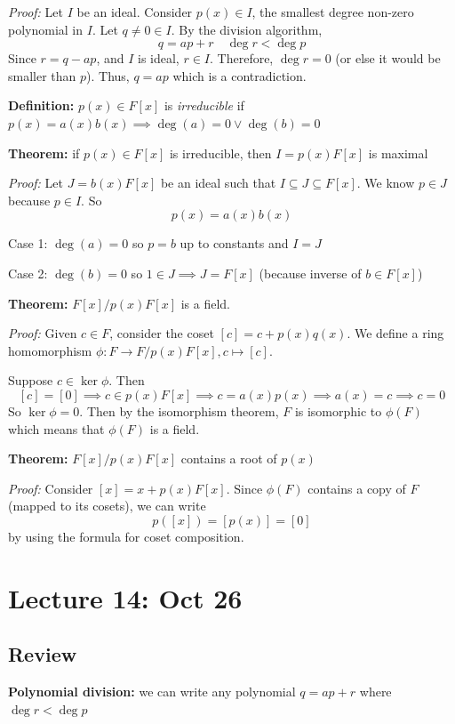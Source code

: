 \documentclass[12pt]{report}
\begin{document}
        \emph{Proof:} Let $I$ be an ideal. Consider $p(x) \in I$, the smallest degree non-zero polynomial in $I$. Let $q \neq 0 \in I$. By the division algorithm,
            \[q = ap + r \quad \deg r < \deg p\]
        Since $r = q - ap$, and $I$ is ideal, $r \in I$. Therefore, $\deg r = 0$ (or else it would be smaller than $p$). Thus, $q = ap$ which is a contradiction. 

    \textbf{Definition:} $p(x) \in F[x]$ is \emph{irreducible} if $p(x) = a(x)b(x) \implies \deg(a) = 0 \lor \deg(b) = 0$

    \textbf{Theorem:} if $p(x) \in F[x]$ is irreducible, then $I = p(x)F[x]$ is maximal

        \emph{Proof:} Let $J = b(x)F[x]$ be an ideal such that $I \subseteq J \subseteq F[x]$. We know $p \in J$ because $p \in I$. So 
        \[p(x) = a(x)b(x)\]

        Case 1: $\deg(a) = 0$ so $p = b$ up to constants and $I = J$

        Case 2: $\deg(b) = 0$ so $1 \in J \implies J = F[x]$ (because inverse of $b \in F[x]$)

    \textbf{Theorem:} $F[x]/p(x)F[x]$ is a field. 

        \emph{Proof:} Given $c \in F$, consider the coset $[c] = c + p(x)q(x)$. We define a ring homomorphism $\phi: F \to F/p(x)F[x], c \mapsto [c]$. 
        
        Suppose $c \in \ker\phi$. Then 
        \[[c] = [0] \implies c \in p(x)F[x] \implies c = a(x)p(x) \implies a(x) = c \implies c = 0\]
        So $\ker \phi = 0$. Then by the isomorphism theorem, $F$ is isomorphic to $\phi(F)$ which means that $\phi(F)$ is a field.

    \textbf{Theorem:} $F[x]/p(x)F[x]$ contains a root of $p(x)$

        \emph{Proof:} Consider $[x] = x + p(x) F[x]$. Since $\phi(F)$ contains a copy of $F$ (mapped to its cosets), we can write 
        \[p([x]) = [p(x)] = [0]\]
        by using the formula for coset composition. 

\section*{Lecture 14: Oct 26}
    \subsection*{Review}
        \textbf{Polynomial division:} we can write any polynomial $q = ap + r$ where $\deg r < \deg p$
\end{document}
